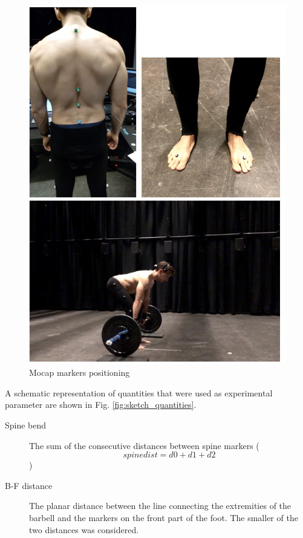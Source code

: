 \documentclass[10pt,letterpaper]{article}
\begin{document}
\begin{figure}[!h]
\center
\includegraphics[width=.8\textwidth]{figures/combination_markers.jpg}
\caption{Mocap markers positioning}
\label{fig:set-up}      
\end{figure}

A schematic representation of quantities that were used as experimental parameter are shown in Fig. \ref{fig:sketch_quantities}.
\begin{description}
\item[Spine bend] The sum of the consecutive distances between spine markers ($$spine dist = d0+d1+d2$$) 
\item[B-F distance] The planar distance between the line connecting the extremities of the barbell and the markers on the front part of the foot. The smaller of the two distances was considered.
\end{description}
\end{document}
